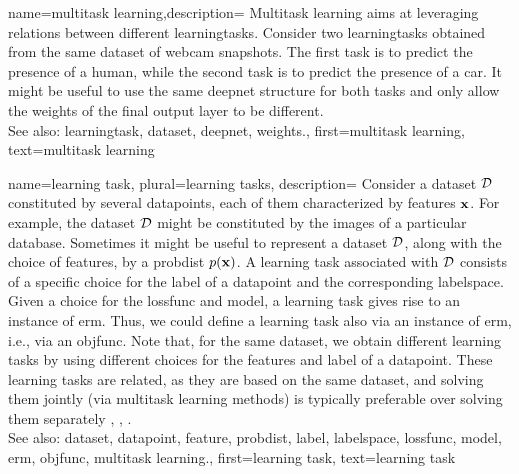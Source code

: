 {name={multitask learning},description=
	{Multitask learning aims at leveraging relations between 
	 different \glspl{learningtask}. Consider two \glspl{learningtask} obtained from the 
	 same \gls{dataset} of webcam snapshots. The first task is to predict the presence 
	 of a human, while the second task is to predict the presence of a car. It might be useful 
	 to use the same \gls{deepnet} structure for both tasks and only allow the \gls{weights} of 
	 the final output layer to be different.
	 			\\ 
		See also: \gls{learningtask}, \gls{dataset}, \gls{deepnet}, \gls{weights}.},
	first={multitask learning},
	text={multitask learning}
}

{name={learning task}, plural={learning tasks}, description=
	{Consider a \gls{dataset} $\mathcal{D}$ constituted by several \glspl{datapoint}, each of them 
	 characterized by \glspl{feature} ${\bf x}$. For example, the \gls{dataset} $\mathcal{D}$ 
	 might be constituted by the images of a particular database. Sometimes it might be useful 
	 to represent a \gls{dataset} $\mathcal{D}$, along with the choice of \glspl{feature}, by a \gls{probdist} $p({\bf x})$. 
	 A learning task associated with $\mathcal{D}$ consists of a specific 
	 choice for the \gls{label} of a \gls{datapoint} and the corresponding \gls{labelspace}. 
	 Given a choice for the \gls{lossfunc} and \gls{model}, a learning task gives rise to an 
	 instance of \gls{erm}. Thus, we could define a learning task also via an instance of \gls{erm}, i.e., 
	 via an \gls{objfunc}. Note that, for the same \gls{dataset}, we obtain different learning tasks by using 
	 different choices for the \glspl{feature} and \gls{label} of a \gls{datapoint}. These learning 
	 tasks are related, as they are based on the same \gls{dataset}, and solving them jointly 
	 (via \gls{multitask learning} methods) is typically preferable over solving them separately \cite{Caruana:1997wk}, \cite{JungGaphLassoSPL}, \cite{CSGraphSelJournal}.
	 			\\ 
		See also: \gls{dataset}, \gls{datapoint}, \gls{feature}, \gls{probdist}, \gls{label}, \gls{labelspace}, \gls{lossfunc}, \gls{model}, \gls{erm}, \gls{objfunc}, \gls{multitask learning}.},
	first={learning task},
	text={learning task}
}

